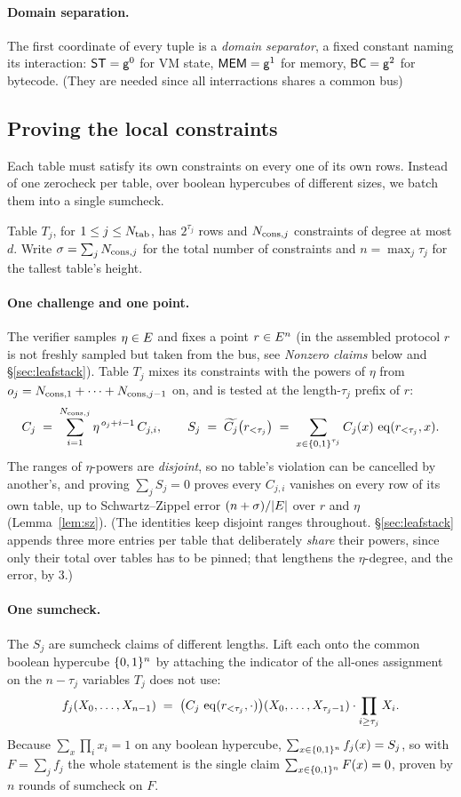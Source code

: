 \paragraph{Domain separation.} The first coordinate of every tuple is a \emph{domain separator}, a fixed constant naming its interaction: $\mathsf{ST}=\mathsf{g}^{0}$ for VM state, $\mathsf{MEM}=\mathsf{g}^{1}$ for memory, $\mathsf{BC}=\mathsf{g}^{2}$ for bytecode. (They are needed since all interractions shares a common bus)

\subsection{Proving the local constraints}\label{sec:air}

Each table must satisfy its own constraints on every one of its own rows. Instead of one zerocheck per table, over boolean hypercubes of different sizes, we batch them into a single sumcheck.

Table $T_j$, for $1\le j\le N_{\mathrm{tab}}$, has $2^{\tau_j}$ rows and $N_{\mathrm{cons},j}$ constraints of degree at most $d$. Write $\sigma=\sum_jN_{\mathrm{cons},j}$ for the total number of constraints and $n=\max_j\tau_j$ for the tallest table's height.

\paragraph{One challenge and one point.} The verifier samples $\eta\in E$ and fixes a point $r\in E^{n}$ (in the assembled protocol $r$ is not freshly sampled but taken from the bus, see \emph{Nonzero claims} below and \S\ref{sec:leafstack}). Table $T_j$ mixes its constraints with the powers of $\eta$ from $o_j=N_{\mathrm{cons},1}+\dots+N_{\mathrm{cons},j-1}$ on, and is tested at the length-$\tau_j$ prefix of $r$:
\[
  C_j\;=\;\sum_{i=1}^{N_{\mathrm{cons},j}}\eta^{\,o_j+i-1}\,C_{j,i},
  \qquad
  S_j\;=\;\widetilde{C_j}\bigl(r_{<\tau_j}\bigr)\;=\;\sum_{x\in\{0,1\}^{\tau_j}}C_j(x)\,\operatorname{eq}(r_{<\tau_j},x).
\]
The ranges of $\eta$-powers are \emph{disjoint}, so no table's violation can be cancelled by another's, and proving $\sum_j S_j=0$ proves every $C_{j,i}$ vanishes on every row of its own table, up to Schwartz--Zippel error $(n+\sigma)/|E|$ over $r$ and $\eta$ (Lemma~\ref{lem:sz}). (The identities keep disjoint ranges throughout. \S\ref{sec:leafstack} appends three more entries per table that deliberately \emph{share} their powers, since only their total over tables has to be pinned; that lengthens the $\eta$-degree, and the error, by $3$.)

\paragraph{One sumcheck.} The $S_j$ are sumcheck claims of different lengths. Lift each onto the common boolean hypercube $\{0,1\}^{n}$ by attaching the indicator of the all-ones assignment on the $n-\tau_j$ variables $T_j$ does not use:
\[
  f_j(X_0,\dots,X_{n-1})\;=\;\bigl(C_j\,\operatorname{eq}(r_{<\tau_j},\cdot)\bigr)(X_0,\dots,X_{\tau_j-1})\cdot\prod_{i\ge\tau_j}X_i .
\]
Because $\sum_x\prod_i x_i=1$ on any boolean hypercube, $\sum_{x\in\{0,1\}^{n}}f_j(x)=S_j$, so with $F=\sum_j f_j$ the whole statement is the single claim $\sum_{x\in\{0,1\}^{n}}F(x)=0$, proven by $n$ rounds of sumcheck on $F$.


